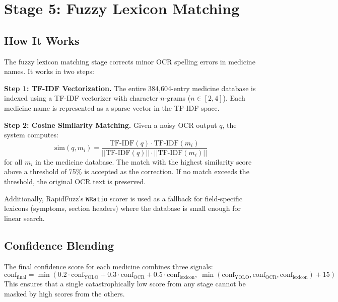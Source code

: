 \documentclass[12pt,a4paper,oneside]{report}
\begin{document}
\section{Stage 5: Fuzzy Lexicon Matching}

\subsection{How It Works}

The fuzzy lexicon matching stage corrects minor OCR spelling errors in medicine names. It works in two steps:

\textbf{Step 1: TF-IDF Vectorization.} The entire 384{,}604-entry medicine database is indexed using a TF-IDF vectorizer with character $n$-grams ($n \in [2, 4]$). Each medicine name is represented as a sparse vector in the TF-IDF space.

\textbf{Step 2: Cosine Similarity Matching.} Given a noisy OCR output $q$, the system computes:
\begin{equation}
\text{sim}(q, m_i) = \frac{\text{TF-IDF}(q) \cdot \text{TF-IDF}(m_i)}{||\text{TF-IDF}(q)|| \cdot ||\text{TF-IDF}(m_i)||}
\end{equation}
for all $m_i$ in the medicine database. The match with the highest similarity score above a threshold of 75\% is accepted as the correction. If no match exceeds the threshold, the original OCR text is preserved.

Additionally, RapidFuzz's \texttt{WRatio} scorer is used as a fallback for field-specific lexicons (symptoms, section headers) where the database is small enough for linear search.

\subsection{Confidence Blending}

The final confidence score for each medicine combines three signals:
\begin{equation}
\text{conf}_{\text{final}} = \min\left(0.2 \cdot \text{conf}_{\text{YOLO}} + 0.3 \cdot \text{conf}_{\text{OCR}} + 0.5 \cdot \text{conf}_{\text{lexicon}}, \; \min(\text{conf}_{\text{YOLO}}, \text{conf}_{\text{OCR}}, \text{conf}_{\text{lexicon}}) + 15\right)
\end{equation}
This ensures that a single catastrophically low score from any stage cannot be masked by high scores from the others.


\end{document}
